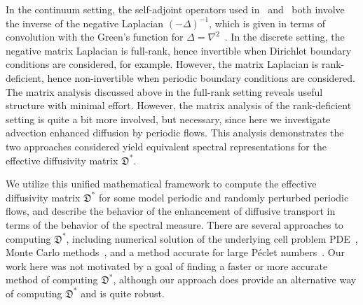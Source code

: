 \documentclass[english,12pt,jmp,graphicx]{revtex4-1}
\newcommand{\Dg}{\mathfrak{D}}
\begin{document}
In the continuum setting, the self-adjoint operators used
in~\cite{Avellaneda:PRL-753,Avellaneda:CMP-339}
and~\cite{Pavliotis:PHD_Thesis} both involve the inverse of the negative
Laplacian $(-\Delta)^{-1}$, which is given in terms of convolution with
the Green's function for
$\Delta=\nabla^2$~\cite{Stakgold:BVP:2000}. In the discrete setting,
the negative matrix Laplacian is full-rank, hence invertible when
Dirichlet boundary conditions are considered, for example. However,
the matrix Laplacian is rank-deficient, hence non-invertible when
periodic boundary conditions are considered. The matrix analysis
discussed above in the full-rank setting 
reveals useful 
structure with minimal effort. However, the matrix analysis of the
rank-deficient setting is quite a bit more involved, but necessary,
since here we investigate advection enhanced diffusion by periodic
flows. This analysis demonstrates the two approaches considered yield
equivalent spectral representations for the effective diffusivity
matrix $\Dg^*$.



We utilize this unified mathematical framework to compute the
effective diffusivity matrix $\Dg^*$ for some model periodic and
randomly perturbed periodic flows, and describe the behavior of the
enhancement of diffusive transport in terms of the behavior of the
spectral measure. There are several approaches to computing $\Dg^*$,
including numerical solution of the underlying cell problem
PDE~\cite{Pavliotis:PHD_Thesis}, Monte Carlo
methods~\cite{Bonn:McLaughlin:JFM:2001:345}, and a method accurate 
for large {P}\'eclet numbers~\cite{Gorb:Nam:Novikov:2746477}. 
Our work here was not motivated by a goal of finding a faster
or more accurate method of computing $\Dg^*$, although our
approach does provide an alternative way of computing $\Dg^*$
and is quite robust.
\end{document}
